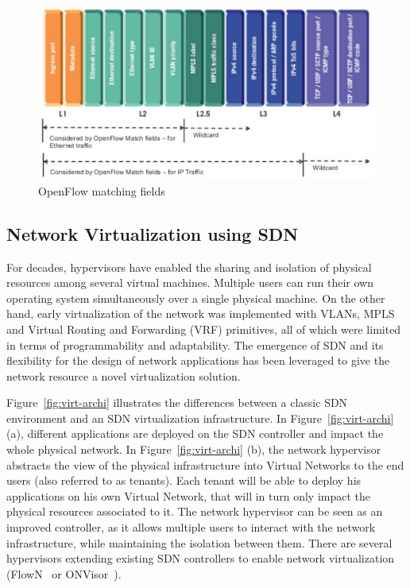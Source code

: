 \begin{figure}[h]
    \centering
    \includegraphics[scale=0.7]{figures/openflow-matchfields.pdf}
    \caption{OpenFlow matching fields~\cite{openflow-matchfields}}
    \label{fig:matching-fields}
\end{figure}

\subsection{Network Virtualization using SDN}
\label{def:netvirt}

For decades, hypervisors have enabled the sharing and isolation of physical resources among several virtual machines.
Multiple users can run their own operating system simultaneously over a single physical machine.
On the other hand, early virtualization of the network was implemented with VLANs, MPLS and Virtual Routing and Forwarding (VRF) primitives, all of which were limited in terms of programmability and adaptability. The emergence of SDN and its flexibility for the design of network applications has been leveraged to give the network resource a novel virtualization solution.

Figure~\ref{fig:virt-archi} illustrates the differences between a classic SDN environment and an SDN virtualization infrastructure. In Figure~\ref{fig:virt-archi} (a), different applications are deployed on the SDN controller and impact the whole physical network.
In Figure~\ref{fig:virt-archi} (b), the network hypervisor abstracts the view of the physical infrastructure into Virtual Networks to the end users (also referred to as tenants).
Each tenant will be able to deploy his applications on his own Virtual Network, that will in turn only impact the physical resources associated to it.
The network hypervisor can be seen as an improved controller, as it allows multiple users to interact with the network infrastructure, while maintaining the isolation between them.
There are several hypervisors extending existing SDN controllers to enable network virtualization (\eg FlowN~\cite{FlowN-Drutskoy2012} or ONVisor~\cite{ONVisor-Han2018}).

